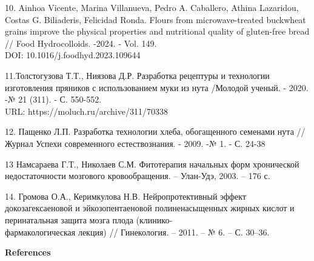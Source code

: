 \begin{references}
10. Ainhoa Vicente, Marina Villanueva, Pedro A. Caballero, Athina
Lazaridou, Costas G. Biliaderis, Felicidad Ronda. Flours from
microwave-treated buckwheat grains improve the physical properties and
nutritional quality of gluten-free bread // Food Hydrocolloids. -2024. -
Vol. 149. \\DOI: 10.1016/j.foodhyd.2023.109644

11.Толстогузова Т.Т., Ниязова Д.Р. Разработка рецептуры и технологии
изготовления пряников с использованием муки из нута /Молодой ученый. -
2020. -№ 21 (311). - С. 550-552. \\URL:
https://moluch.ru/archive/311/70338

12. Пащенко Л.П. Разработка технологии хлеба, обогащенного семенами нута
//Журнал Успехи современного естествознания. - 2009. -№ 1. - С. 24-38

13 Намсараева Г.Т., Николаев С.М. Фитотерапия начальных форм хронической
недостаточности мозгового кровообращения. -- Улан-Удэ, 2003. -- 176 с.

14. Громова О.А., Керимкулова Н.В. Нейропротективный эффект
докозагексаеновой и эйкозопентаеновой полиненасыщенных жирных кислот и
перинатальная защита мозга плода (клинико-\\фармакологическая лекция) //
Гинекология. -- 2011. -- № 6. -- С. 30--36.

\end{references}

\begin{center}
{\bfseries References}
\end{center}

